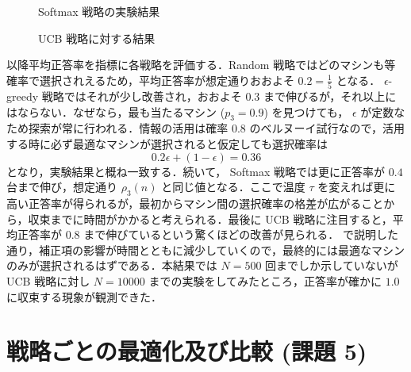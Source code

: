 \documentclass{jsarticle}
\newlength{\figwidth}
\begin{document}
\begin{figure}[H]
\centering
{}
\caption{Softmax 戦略の実験結果}\label{fig:res:sm}
\end{figure}

\begin{figure}[H]
\centering
{}
\caption{UCB 戦略に対する結果}\label{fig:res:ucb}
\end{figure}

以降平均正答率を指標に各戦略を評価する．Random 戦略ではどのマシンも等確率で選択されえるため，平均正答率が想定通りおおよそ $0.2 = \frac{1}{5}$ となる． $\epsilon$-greedy 戦略ではそれが少し改善され，おおよそ $0.3$ まで伸びるが，それ以上にはならない．なぜなら，最も当たるマシン ($p_3 = 0.9$) を見つけても， $\epsilon$ が定数なため探索が常に行われる．情報の活用は確率 $0.8$ のベルヌーイ試行なので，活用する時に必ず最適なマシンが選択されると仮定しても選択確率は
\begin{equation}
  0.2\epsilon + (1 - \epsilon) = 0.36
\end{equation}
となり，実験結果と概ね一致する．続いて， Softmax 戦略では更に正答率が $0.4$ 台まで伸び，想定通り $\rho_3(n)$ と同じ値となる．ここで温度 $\tau$ を変えれば更に高い正答率が得られるが，最初からマシン間の選択確率の格差が広がることから，収束までに時間がかかると考えられる．最後に UCB 戦略に注目すると，平均正答率が $0.8$ まで伸びているという驚くほどの改善が見られる． で説明した通り，補正項の影響が時間とともに減少していくので，最終的には最適なマシンのみが選択されるはずである．本結果では $N = 500$ 回までしか示していないが UCB 戦略に対し $N = 10000$ までの実験をしてみたところ，正答率が確かに $1.0$ に収束する現象が観測できた．

\section{戦略ごとの最適化及び比較 (課題 5)}\label{sec:k5}
\end{document}
